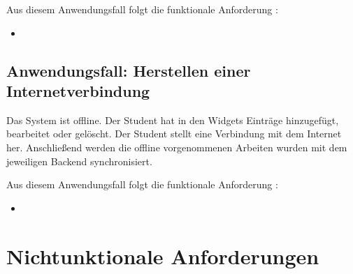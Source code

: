 Aus diesem Anwendungsfall folgt die funktionale Anforderung :
\begin{itemize}
 \item \requirementf{\requirementOfflineWork}\label{requirementOfflineWork}
\end{itemize}

\subsection{Anwendungsfall: Herstellen einer Internetverbindung}
Das System ist offline. Der Student hat in den Widgets Einträge hinzugefügt, bearbeitet oder gelöscht. Der Student stellt eine Verbindung mit dem Internet her. Anschließend werden die offline vorgenommenen Arbeiten wurden mit dem jeweiligen Backend synchronisiert.

Aus diesem Anwendungsfall folgt die funktionale Anforderung :
\begin{itemize}
 \item \requirementf{\requirementOnlineSync}\label{requirementOnlineSync}
\end{itemize}

\section{Nichtunktionale Anforderungen}\label{section:nichtfunktionale_anforderunge}

